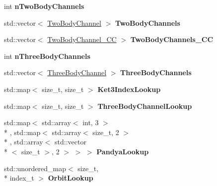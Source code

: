 \begin{DoxyCompactItemize}
\item 
\hypertarget{classModelSpace_aea2ac4cf6e2f53d7cd96b208cbc165f3}{int {\bfseries n\-Two\-Body\-Channels}}\label{classModelSpace_aea2ac4cf6e2f53d7cd96b208cbc165f3}

\item 
\hypertarget{classModelSpace_a9f36ca070b17389a2bdbd42345de509c}{std\-::vector$<$ \hyperlink{structTwoBodyChannel}{Two\-Body\-Channel} $>$ {\bfseries Two\-Body\-Channels}}\label{classModelSpace_a9f36ca070b17389a2bdbd42345de509c}

\item 
\hypertarget{classModelSpace_aad7f4fd5fa7c46f3a7a138c1e5092eda}{std\-::vector$<$ \hyperlink{classTwoBodyChannel__CC}{Two\-Body\-Channel\-\_\-\-C\-C} $>$ {\bfseries Two\-Body\-Channels\-\_\-\-C\-C}}\label{classModelSpace_aad7f4fd5fa7c46f3a7a138c1e5092eda}

\item 
\hypertarget{classModelSpace_ae7fa8dbcfa332a12deddded4668fef27}{int {\bfseries n\-Three\-Body\-Channels}}\label{classModelSpace_ae7fa8dbcfa332a12deddded4668fef27}

\item 
\hypertarget{classModelSpace_a239c61460654666a38186200f98a7e78}{std\-::vector$<$ \hyperlink{structThreeBodyChannel}{Three\-Body\-Channel} $>$ {\bfseries Three\-Body\-Channels}}\label{classModelSpace_a239c61460654666a38186200f98a7e78}

\item 
\hypertarget{classModelSpace_a48e8ed13953ea31bdec3e87081800072}{std\-::map$<$ size\-\_\-t, size\-\_\-t $>$ {\bfseries Ket3\-Index\-Lookup}}\label{classModelSpace_a48e8ed13953ea31bdec3e87081800072}

\item 
\hypertarget{classModelSpace_af2d87920d4e5b5843e8d50bd7f9b35da}{std\-::map$<$ size\-\_\-t, size\-\_\-t $>$ {\bfseries Three\-Body\-Channel\-Lookup}}\label{classModelSpace_af2d87920d4e5b5843e8d50bd7f9b35da}

\item 
\hypertarget{classModelSpace_a38e1f354ad148cb7ac7abaee711de543}{std\-::map$<$ std\-::array$<$ int, 3 $>$\\*
, std\-::map$<$ std\-::array$<$ size\-\_\-t, 2 $>$\\*
, std\-::array$<$ std\-::vector\\*
$<$ size\-\_\-t $>$, 2 $>$ $>$ $>$ {\bfseries Pandya\-Lookup}}\label{classModelSpace_a38e1f354ad148cb7ac7abaee711de543}

\item 
\hypertarget{classModelSpace_ab3ecc80bf34623673bfd0193ce5ae056}{std\-::unordered\-\_\-map$<$ size\-\_\-t, \\*
index\-\_\-t $>$ {\bfseries Orbit\-Lookup}}\label{classModelSpace_ab3ecc80bf34623673bfd0193ce5ae056}


\end{DoxyCompactItemize}
